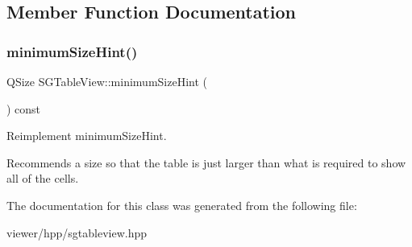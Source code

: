 \subsection{Member Function Documentation}
\mbox{\label{classSGTableView_aa43840054c859a9c6e459f03a63e41a5}} 
\subsubsection{\texorpdfstring{minimum\+Size\+Hint()}{minimumSizeHint()}}
{\footnotesize\ttfamily Q\+Size S\+G\+Table\+View\+::minimum\+Size\+Hint (\begin{DoxyParamCaption}{ }\end{DoxyParamCaption}) const\hspace{0.3cm}{\ttfamily [inline]}}



Reimplement minimum\+Size\+Hint. 

Recommends a size so that the table is just larger than what is required to show all of the cells. 

The documentation for this class was generated from the following file\+:\begin{DoxyCompactItemize}
\item 
viewer/hpp/sgtableview.\+hpp\end{DoxyCompactItemize}
